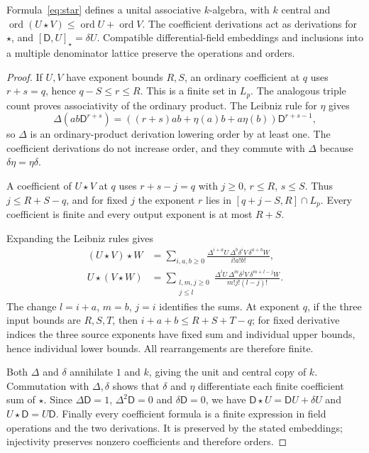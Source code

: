 \documentclass{article}
\newcommand{\DD}{\mathsf D}
\newcommand{\ord}{\operatorname{ord}}
\begin{document}
\begin{lemma}\label{lem:algebra}
Formula~\eqref{eq:star} defines a unital associative $k$-algebra, with $k$ central and
$\ord(U\star V)\leq\ord U+\ord V$. The coefficient derivations act as derivations for $\star$, and
$[\DD,U]_\star=\delta U$. Compatible differential-field embeddings and inclusions into a multiple denominator lattice preserve the operations and orders.
\end{lemma}
\begin{proof}
If $U,V$ have exponent bounds $R,S$, an ordinary coefficient at $q$ uses $r+s=q$, hence $q-S\leq r\leq R$. This is a finite set in $L_p$. The analogous triple count proves associativity of the ordinary product. The Leibniz rule for $\eta$ gives
\[
 \Delta(ab\DD^{r+s})=((r+s)ab+\eta(a)b+a\eta(b))\DD^{r+s-1},
\]
so $\Delta$ is an ordinary-product derivation lowering order by at least one. The coefficient derivations do not increase order, and they commute with $\Delta$ because $\delta\eta=\eta\delta$.

A coefficient of $U\star V$ at $q$ uses $r+s-j=q$ with $j\geq0$, $r\leq R$, $s\leq S$. Thus $j\leq R+S-q$, and for fixed $j$ the exponent $r$ lies in $[q+j-S,R]\cap L_p$. Every coefficient is finite and every output exponent is at most $R+S$.

Expanding the Leibniz rules gives
\begin{align*}
 (U\star V)\star W
 &=\sum_{i,a,b\geq0}
 \frac{\Delta^{i+a}U\,\Delta^b\delta^iV\,\delta^{a+b}W}{i!a!b!},\\
 U\star(V\star W)
 &=\sum_{\substack{l,m,j\geq0\\j\leq l}}
 \frac{\Delta^lU\,\Delta^m\delta^jV\,\delta^{m+l-j}W}{m!j!(l-j)!}.
\end{align*}
The change $l=i+a$, $m=b$, $j=i$ identifies the sums. At exponent $q$, if the three input bounds are $R,S,T$, then $i+a+b\leq R+S+T-q$; for fixed derivative indices the three source exponents have fixed sum and individual upper bounds, hence individual lower bounds. All rearrangements are therefore finite.

Both $\Delta$ and $\delta$ annihilate $1$ and $k$, giving the unit and central copy of $k$. Commutation with $\Delta,\delta$ shows that $\delta$ and $\eta$ differentiate each finite coefficient sum of $\star$. Since $\Delta\DD=1$, $\Delta^2\DD=0$ and $\delta\DD=0$, we have $\DD\star U=\DD U+\delta U$ and $U\star\DD=U\DD$. Finally every coefficient formula is a finite expression in field operations and the two derivations. It is preserved by the stated embeddings; injectivity preserves nonzero coefficients and therefore orders.
\end{proof}
\end{document}
